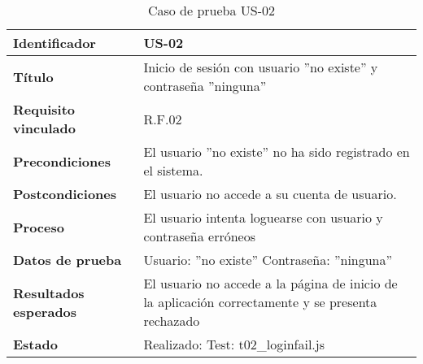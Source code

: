 \begin{table}[H]
	\centering
	\renewcommand{\arraystretch}{1.3} 
	\begin{tabularx}{\textwidth}{|l|X|}
		\hline
		\textbf{Identificador} & US-02 \\
		\hline
		\textbf{Título} & Inicio de sesión con usuario ''no existe'' y contraseña ''ninguna'' \\
		\hline
		\textbf{Requisito vinculado} & R.F.02 \\
		\hline
		\textbf{Precondiciones} & El usuario ''no existe'' no ha sido registrado en el sistema. \\
		\hline
		\textbf{Postcondiciones} & El usuario no accede a su cuenta de usuario. \\
		\hline
		\textbf{Proceso} & El usuario intenta loguearse con usuario y contraseña erróneos \\
		\hline
		\textbf{Datos de prueba} & Usuario: ''no existe'' Contraseña: ''ninguna'' \\
		\hline
		\textbf{Resultados esperados} & El usuario no accede a la página de inicio de la aplicación correctamente y se presenta rechazado \\
		\hline
		\textbf{Estado} & Realizado: Test: t02\_loginfail.js \\
		\hline
	\end{tabularx}
	\caption{Caso de prueba US-02}
	\label{tab:caso_us02}
\end{table}
